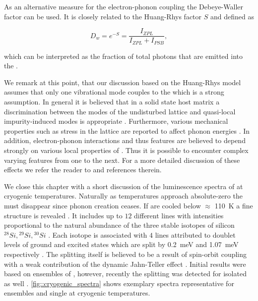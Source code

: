    As an alternative measure for the electron-phonon coupling the Debeye-Waller factor can be used. It is closely related to the Huang-Rhys factor $S$ and defined as

   \begin{equation}
     D_w = e^{-S} = \frac{I_{ZPL}}{I_{ZPL} + I_{PSB}},
   \end{equation}

    which can be interpreted as the fraction of total photons that are emitted into the \zpl.

    We remark at this point, that our discussion based on the Huang-Rhys model assumes that only one vibrational mode couples to the \cc which is a strong assumption. In general it is believed that in a solid state host matrix a discrimination between the modes of the undisturbed lattice and quasi-local impurity-induced modes is appropriate \cite{Zaitsev2000, Feng1993b, Solin1970}. Furthermore, various mechanical properties such as stress in the lattice are reported to affect phonon energies \cite{Grimsditch1978}. In addition, electron-phonon interactions and thus \psb features are believed to depend strongly on various local properties of \ccs \cite{Sternschulte1994, Huttner1995}. Thus it is possible to encounter complex varying \psb features from one \siv to the next. For a more detailed discussion of these effects we refer the reader to \cite{neu2012, Riedrich-moller2014} and references therein.

    We close this chapter with a short discussion of the luminescence spectra of \sivs at cryogenic temperatures. Naturally as temperatures approach absolute-zero the \psb must disappear since phonon creation ceases. If \sivs are cooled below $\approx$ \SI{110}{\kelvin} a fine structure is revealed \cite{becker::45}. It includes up to $12$ different lines with intensities proportional to the natural abundance of the three stable isotopes of silicon ${}^{28}Si, {}^{29}Si, {}^{30}Si$ \cite{Clark1995}. Each isotope is associated with $4$ lines attributed to doublet levels of ground and excited states which are split by \SI{0.2}{\milli\eV} and \SI{1.07}{\milli\eV} respectively \cite{Rogers2014, Hepp2014, Clark1995}. The splitting itself is believed to be a result of spin-orbit coupling with a weak contribution of the dynamic Jahn-Teller effect \cite{Hepp2014}. Initial results were based on ensembles of \sivs, however, recently the splitting was detected for isolated \sivs as well \cite{Dietrich2014a}. \cref{fig::cryogenic_spectra} shows exemplary spectra representative for ensembles and single \siv at cryogenic temperatures.


